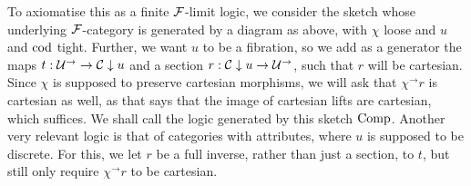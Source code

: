 \documentclass[../thesis.tex]{subfiles}
\begin{document}
To axiomatise this as a finite ${\mathcal{F}}$-limit logic, we consider the sketch whose underlying ${\mathcal{F}}$-category is generated
by a diagram as above, with $\chi$ loose and $u$ and ${\mathrm{cod}}$ tight. Further, we want $u$ to be a fibration, so we add
as a generator the maps $t : {\mathcal{U}}^\to \to {\mathcal{C}} \mathrel{\downarrow} u$ and a section $r : {\mathcal{C}} \mathrel{\downarrow} u \to {\mathcal{U}}^\to$, such that $r$
will be cartesian. Since $\chi$ is supposed to preserve cartesian morphisms, we will ask that $\chi^\to r$ is cartesian
as well, as that says that the image of cartesian lifts are cartesian, which suffices. We shall call the logic generated
by this sketch ${\mathrm{Comp}}$. Another very relevant logic is that of categories with attributes, where $u$ is supposed to be
discrete. For this, we let $r$ be a full inverse, rather than just a section, to $t$, but still only require $\chi^\to r$
to be cartesian.
\end{document}
